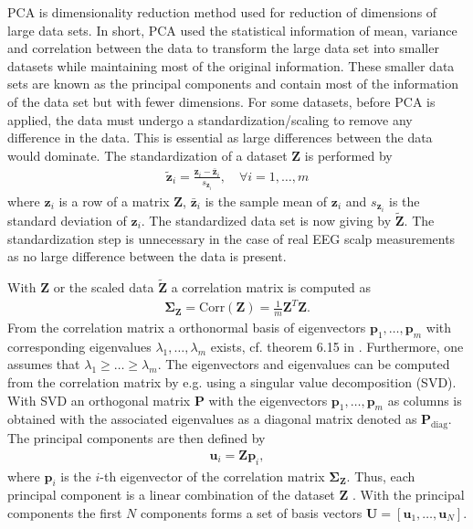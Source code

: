 PCA is dimensionality reduction method used for reduction of dimensions of large data sets. 
In short, PCA used the statistical information of mean, variance and correlation between the data to transform the large data set into smaller datasets while maintaining most of the original information. 
These smaller data sets are known as the principal components and contain most of the information of the data set but with fewer dimensions. 
For some datasets, before PCA is applied, the data must undergo a standardization/scaling to remove any difference in the data. 
This is essential as large differences between the data would dominate. The standardization of a dataset $\mathbf{Z}$ is performed by
\begin{align*}
\tilde{\mathbf{z}}_i = \frac{\mathbf{z}_i - \bar{\mathbf{z}}_i}{s_{\mathbf{z}_i}}, \quad \forall i = 1, \dots, m
\end{align*}
where $\mathbf{z}_i$ is a row of a matrix $\mathbf{Z}$, $\bar{\mathbf{z}}_i$ is the sample mean of $\mathbf{z}_i$ and $s_{\mathbf{z}_i}$ is the standard deviation of $\mathbf{z}_i$. 
The standardized data set is now giving by $\tilde{\mathbf{Z}}$. 
The standardization step is unnecessary in the case of real EEG scalp measurements as no large difference between the data is present.

With $\mathbf{Z}$ or the scaled data $\tilde{\mathbf{Z}}$ a correlation matrix is computed as
\begin{align*}
\boldsymbol{\Sigma}_{\mathbf{Z}} = \text{Corr}(\mathbf{Z}) = \frac{1}{m} \mathbf{Z}^T \mathbf{Z}.
\end{align*}
From the correlation matrix a orthonormal basis of eigenvectors $\mathbf{p}_1, \dots, \mathbf{p}_m$ with corresponding eigenvalues $\lambda_1, \dots, \lambda_m$ exists, cf. theorem 6.15 in \cite[p. 375]{PCA}. 
Furthermore, one assumes that $\lambda_1 \geq \dots \geq \lambda_m$. 
The eigenvectors and eigenvalues can be computed from the correlation matrix by e.g. using a singular value decomposition (SVD). 
With SVD an orthogonal matrix $\mathbf{P}$ with the eigenvectors $\mathbf{p}_1, \dots, \mathbf{p}_m$ as columns is obtained with the associated eigenvalues as a diagonal matrix denoted as $\mathbf{P}_{\text{diag}}$.
The principal components are then defined by
\begin{align*}
\mathbf{u}_i = \mathbf{Z} \mathbf{p}_i,
\end{align*}
where $\mathbf{p}_i$ is the $i$-th eigenvector of the correlation matrix $\boldsymbol{\Sigma}_{\mathbf{Z}}$. 
Thus, each principal component is a linear combination of the dataset $\mathbf{Z}$ \cite[p. 460] {PCA}. 
With the principal components the first $N$ components forms a set of basis vectors $\mathbf{U} = [\mathbf{u}_1, \dots, \mathbf{u}_N]$.


